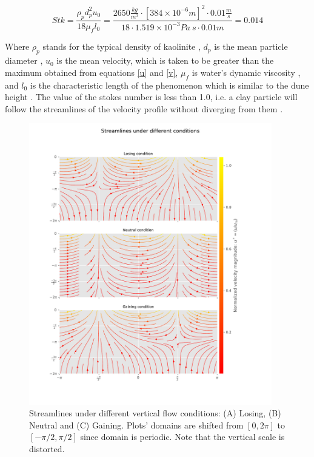 \documentclass[draft,linenumbers]{agujournal2018}
\begin{document}
\begin{equation}
 \label{STK}
 	Stk = \frac{\rho_p d_p^2 u_0}{18 \mu_f l_0} = \frac{2650 \frac{kg}{m^3} \cdot [384 \times 10^{-6}m]^2 \cdot 0.01 \frac{m}{s}}{18 \cdot 1.519 \times 10^{-3}Pa \ s \cdot 0.01 m} = 0.014
 \end{equation}

Where $\rho_p$ stands for the typical density of kaolinite \citep{NationalCenterforBiotechnologyInformation}, $d_p$ is the mean particle diameter \citep{Fox2014}, $u_0$ is the mean velocity, which is taken to be greater than the maximum obtained from equations \ref{u} and \ref{v}, $\mu_f$ is water's dynamic viscosity \citep{Cengel2006}, and $l_0$ is the characteristic length of the phenomenon which is similar to the dune height \citep{Fox2018}. The value of the stokes number is less than 1.0, i.e. a clay particle will follow the streamlines of the velocity profile without diverging from them \citep{Tropea2007}.

\begin{figure}[ht]
\centering
\includegraphics[trim=2cm 1.5cm 4cm 0.1cm, width=25pc]
{181203_Streamlines.pdf}
\caption{Streamlines under different vertical flow conditions: (A) Losing, (B) Neutral and (C) Gaining. Plots' domains are shifted from $[0, 2 \pi]$ to $[-\pi /2, \pi/2]$ since domain is periodic. Note that the vertical scale is distorted.}
\label{Velocities}
\end{figure}
\end{document}
